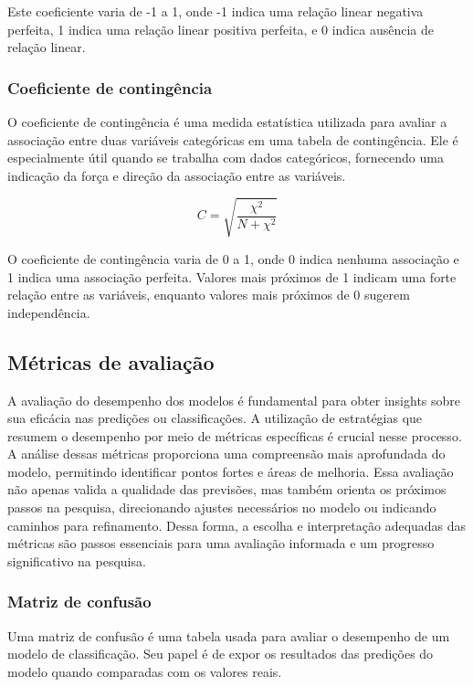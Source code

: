 Este coeficiente varia de -1 a 1, onde -1 indica uma relação linear negativa perfeita, 
1 indica uma relação linear positiva perfeita, e 0 indica ausência de relação linear.

\subsubsection{Coeficiente de contingência}

O coeficiente de contingência é uma medida estatística utilizada para avaliar a associação
entre duas variáveis categóricas em uma tabela de contingência. Ele é especialmente útil 
quando se trabalha com dados categóricos, fornecendo uma indicação da força e direção da associação entre as variáveis.

\begin{equation}
  C = \sqrt{\frac{\chi^2}{N + \chi^2}}
\end{equation}

O coeficiente de contingência varia de 0 a 1, onde 0 indica nenhuma associação e 1 indica uma associação perfeita. 
Valores mais próximos de 1 indicam uma forte relação entre as variáveis, enquanto valores mais próximos de 0 sugerem independência.

\subsection{Métricas de avaliação}

A avaliação do desempenho dos modelos é fundamental para obter insights sobre sua eficácia nas predições ou classificações. 
A utilização de estratégias que resumem o desempenho por meio de métricas específicas é crucial nesse processo.
A análise dessas métricas proporciona uma compreensão mais aprofundada do modelo, permitindo identificar pontos 
fortes e áreas de melhoria. Essa avaliação não apenas valida a qualidade das previsões, mas também orienta os próximos
passos na pesquisa, direcionando ajustes necessários no modelo ou indicando caminhos para refinamento. 
Dessa forma, a escolha e interpretação adequadas das métricas são passos essenciais para uma avaliação informada 
e um progresso significativo na pesquisa.

\subsubsection{Matriz de confusão}

Uma matriz de confusão é uma tabela usada para avaliar o desempenho de um modelo de classificação.
Seu papel é de expor os resultados das predições do modelo quando comparadas com os valores reais.

